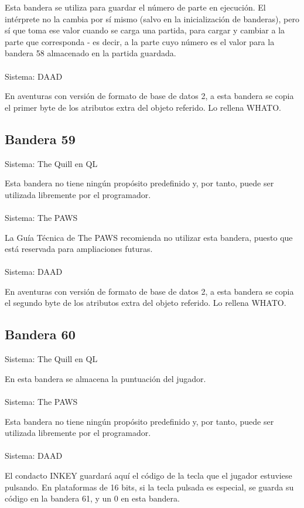 \documentclass[11pt, a5paper]{article}
\newcommand{\quill}{\textsf{The Quill}\xspace}
\newcommand{\paw}{\textsf{The PAWS}\xspace}
\newcommand{\daad}{\textsf{DAAD}\xspace}
\newcommand{\sistema}[1]{\noindent Sistema: #1 \nopagebreak}
\begin{document}
Esta bandera se utiliza para guardar el número de parte en ejecución. El intérprete no la cambia por sí mismo (salvo en la inicialización de banderas), pero sí que toma ese valor cuando se carga una partida, para cargar y cambiar a la parte que corresponda - es decir, a la parte cuyo número es el valor para la bandera 58 almacenado en la partida guardada.
\\\ \\
\sistema{\daad}

En aventuras con versión de formato de base de datos 2, a esta bandera se copia el primer byte de los atributos extra del objeto referido. Lo rellena WHATO.

\subsection{Bandera 59}

\sistema{\quill en QL}

Esta bandera no tiene ningún propósito predefinido y, por tanto, puede ser utilizada libremente por el programador.
\\\ \\
\sistema{\paw}

La Guía Técnica de \paw \cite{PawsZX} recomienda no utilizar esta bandera, puesto que está reservada para ampliaciones futuras.
\\\ \\
\sistema{\daad}

En aventuras con versión de formato de base de datos 2, a esta bandera se copia el segundo byte de los atributos extra del objeto referido. Lo rellena WHATO.

\subsection{Bandera 60}\label{flag60}

\sistema{\quill en QL}

En esta bandera se almacena la puntuación del jugador.
\\\ \\
\sistema{\paw}

Esta bandera no tiene ningún propósito predefinido y, por tanto, puede ser utilizada libremente por el programador.
\\\ \\
\sistema{\daad}

El condacto INKEY guardará aquí el código de la tecla que el jugador estuviese pulsando. En plataformas de 16 bits, si la tecla pulsada es especial, se guarda su código en la bandera 61, y un 0 en esta bandera. \cite[págs. 25, 61 y 62]{DAAD}
\end{document}
